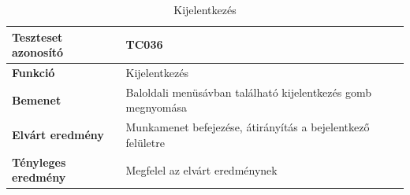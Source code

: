 \begin{table}[h!]
	\centering
	\begin{tabular}{|l|p{10cm}|}
		\hline
		\textbf{Teszteset azonosító} & TC036 \\ \hline
		\textbf{Funkció} & Kijelentkezés \\ \hline
		\textbf{Bemenet} & Baloldali menüsávban található kijelentkezés gomb megnyomása \\ \hline
		\textbf{Elvárt eredmény} & Munkamenet befejezése, átirányítás a bejelentkező felületre \\ \hline
		\textbf{Tényleges eredmény} & Megfelel az elvárt eredménynek \\ \hline
	\end{tabular}
	\caption{Kijelentkezés}
	\label{tab:kijelentkezes}
\end{table}


